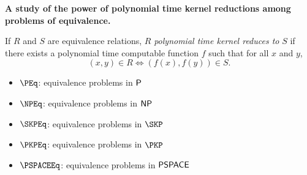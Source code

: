 {\setlength{\parindent}{0cm}\textbf{\large A study of the power of polynomial time kernel reductions among problems of equivalence.}}

\vspace{0.5cm}

\begin{definition}
  If $R$ and $S$ are equivalence relations, $R$ \emph{polynomial time kernel reduces to} $S$ if there exists a polynomial time computable function $f$ such that for all $x$ and $y$,
  \begin{displaymath}
    (x, y)\in R \iff (f(x), f(y))\in S.
  \end{displaymath}
\end{definition}

\vspace{0.5cm}

\begin{definition}\mbox{}
  \begin{itemize}
    \renewcommand{\labelitemi}{$\cdot$}
  \item $\PEq$: equivalence problems in $\P$
  \item $\NPEq$: equivalence problems in $\NP$
  \item $\SKPEq$: equivalence problems in $\SKP$
  \item $\PKPEq$: equivalence problems in $\PKP$
  \item $\PSPACEEq$: equivalence problems in $\PSPACE$
  \end{itemize}
\end{definition}
